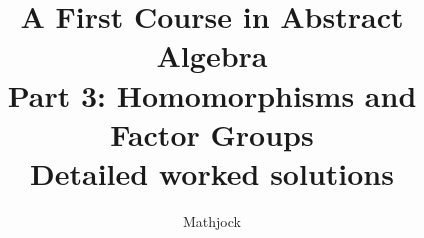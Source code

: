 
\title{\textbf{A First Course in Abstract Algebra}\\[0.3em]Part 3: Homomorphisms and Factor Groups\\[0.3em]\large Detailed worked solutions}
\author{Mathjock}
\date{}

\maketitle
\bookinfo
\tableofcontents
\clearpage
\renewcommand{\thesection}{13}
\renewcommand{\theHsection}{fraleigh.13}

\clearpage
\renewcommand{\thesection}{14}
\renewcommand{\theHsection}{fraleigh.14}

\clearpage
\renewcommand{\thesection}{15}
\renewcommand{\theHsection}{fraleigh.15}

\clearpage
\renewcommand{\thesection}{16}
\renewcommand{\theHsection}{fraleigh.16}

\clearpage
\renewcommand{\thesection}{17}
\renewcommand{\theHsection}{fraleigh.17}


